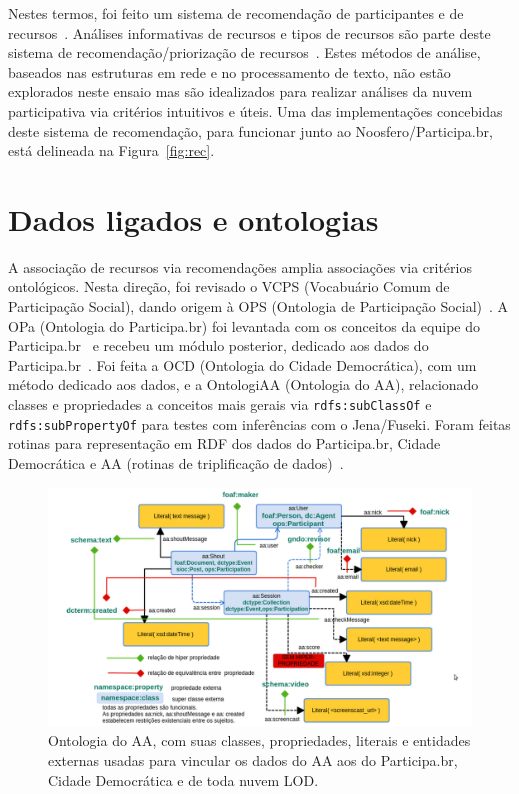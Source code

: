 \documentclass[a4paper, 11pt]{article} %
\begin{document}
Nestes termos, foi feito um sistema de recomendação de participantes e de recursos~\cite{pnud4}. Análises informativas de recursos e tipos de recursos são parte deste sistema de recomendação/priorização de recursos~\cite{pnud3}. Estes métodos de análise, baseados nas estruturas em rede e no processamento de texto, não estão explorados neste ensaio mas são idealizados para realizar análises da nuvem participativa via critérios intuitivos e úteis.
 Uma das implementações concebidas deste sistema de recomendação, para funcionar junto ao Noosfero/Participa.br, está delineada na Figura~\ref{fig:rec}.



\section*{Dados ligados e ontologias}
A associação de recursos via recomendações amplia associações via critérios ontológicos. Nesta direção, foi revisado o VCPS (Vocabuário Comum de Participação Social), dando origem à OPS (Ontologia de Participação Social)~\cite{OPS}. A OPa (Ontologia do Participa.br) foi levantada com os conceitos da equipe do Participa.br~\cite{OPA} e recebeu um módulo posterior, dedicado aos dados do Participa.br~\cite{pnud5}. Foi feita a OCD (Ontologia do Cidade Democrática), com um método dedicado aos dados, e a OntologiAA (Ontologia do AA), relacionado classes e propriedades a conceitos mais gerais via \texttt{rdfs:subClassOf} e \texttt{rdfs:subPropertyOf} para testes com inferências com o Jena/Fuseki. Foram feitas rotinas para representação em RDF dos dados do Participa.br, Cidade Democrática e AA (rotinas de triplificação de dados)~\cite{pnud5}.
\begin{figure}[H]
  \centering
    \includegraphics[width=1.\textwidth]{ontologiaa.png}
  \caption{\small Ontologia do AA, com suas classes, propriedades, literais e entidades externas usadas para vincular os dados do AA aos do Participa.br, Cidade Democrática e de toda nuvem LOD.}\label{fig:ontologiaa}
\end{figure}
\end{document}
